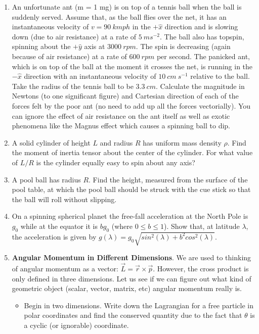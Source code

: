 \documentclass[fleqn]{article}
\begin{document}
\begin{enumerate}
    \item An unfortunate ant (m = 1 mg) is on top of a tennis ball when the ball is suddenly served. Assume that, as the ball flies over the net,
    it has an instantaneous velocity of $v=90 ~ kmph$ in the $+\hat{x}$ direction and is slowing down (due to air resistance) at a rate of
    $5 ~ ms^{-2}$. The ball also has topspin, spinning about the $+\hat{y}$ axis at $3000 ~ rpm$. The spin is decreasing (again because of air resistance) at a rate of
    $600 ~ rpm$ per second. The panicked ant, which is on top of the ball at the moment it crosses the net, is running in the $-\hat{x}$ direction with an
    instantaneous velocity of $10 ~ cm ~ s^{-1}$ relative to the ball. Take the radius of the tennis ball to be $3.3 ~ cm$. Calculate the magnitude in Newtons
    (to one significant figure) and Cartesian direction of each of the forces felt by the poor ant (no need to add up all the forces vectorially). You
    can ignore the effect of air resistance on the ant itself as well as exotic phenomena like the Magnus effect which causes a spinning ball to dip.


    \item A solid cylinder of height $L$ and radius $R$ has uniform mass density $\rho$. Find the moment of inertia tensor about the center of the cylinder. For
    what value of $L/R$ is the cylinder equally easy to spin about any axis?


    \item A pool ball has radius $R$. Find the height, measured from the surface of the pool table, at which the pool ball should be struck with the cue
    stick so that the ball will roll without slipping.


    \item On a spinning spherical planet the free-fall acceleration at the North Pole is $g_0$ while at the equator it is $bg_0$ (where $0\leq b\leq 1$). 
    Show that, at latitude $\lambda$, the acceleration is given by $g(\lambda)=g_0 \sqrt{sin^2(\lambda)+b^2 cos^2(\lambda)}$.


    \item \textbf{Angular Momentum in Different Dimensions}. We are used to thinking of angular momentum as a vector:
    $\overrightarrow{L}=\overrightarrow{r} \times \overrightarrow{p}$. However, the cross product is only defined in three dimensions. Let us
    see if we can figure out what kind of geometric object (scalar, vector,
    matrix, etc) angular momentum really is.
    \begin{itemize}
      \item Begin in two dimensions. Write down the Lagrangian for a free
      particle in polar coordinates and find the conserved quantity due
      to the fact that $\theta$ is a cyclic (or ignorable) coordinate.


\end{itemize}
\end{enumerate}
\end{document}
